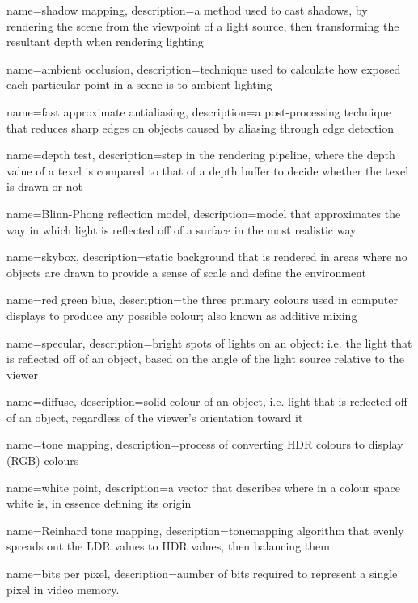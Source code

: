  {
  name=shadow mapping,
  description={a method used to cast shadows, by rendering the scene from the viewpoint of a light source, then transforming the resultant depth when rendering lighting}
}

 {
  name=ambient occlusion,
  description={technique used to calculate how exposed each particular point in a scene is to ambient lighting}
}

 {
  name=fast approximate antialiasing,
  description={a post-processing technique that reduces sharp edges on objects caused by \gls{aliasing} through edge detection}
}

 {
  name=depth test,
  description={step in the rendering pipeline, where the depth value of a texel is compared to that of a depth buffer to decide whether the texel is drawn or not}
}

 {
  name=Blinn-Phong reflection model,
  description={model that approximates the way in which light is reflected off of a surface in the most realistic way}
}

 {
  name=skybox,
  description={static background that is rendered in areas where no objects are drawn to provide a sense of scale and define the environment}
}

 {
  name=red green blue,
  description={the three primary colours used in computer displays to produce any possible colour; also known as additive mixing}
}

 {
  name=specular,
  description={bright spots of lights on an object: i.e. the light that is reflected off of an object, based on the angle of the light source relative to the viewer}
}

 {
  name=diffuse,
  description={solid colour of an object, i.e. light that is reflected off of an object, regardless of the viewer's orientation toward it}
}

 {
  name=tone mapping,
  description={process of converting \gls{HDR} colours to display (\gls{RGB}) colours}
}

 {
  name=white point,
  description={a vector that describes where in a colour space white is, in essence defining its origin}
}

 {
  name=Reinhard tone mapping,
  description={\gls{tonemapping} algorithm that evenly spreads out the \gls{LDR} values to \gls{HDR} values, then balancing them}
}

 {
  name=bits per pixel,
  description={aumber of bits required to represent a single pixel in video memory.}
}